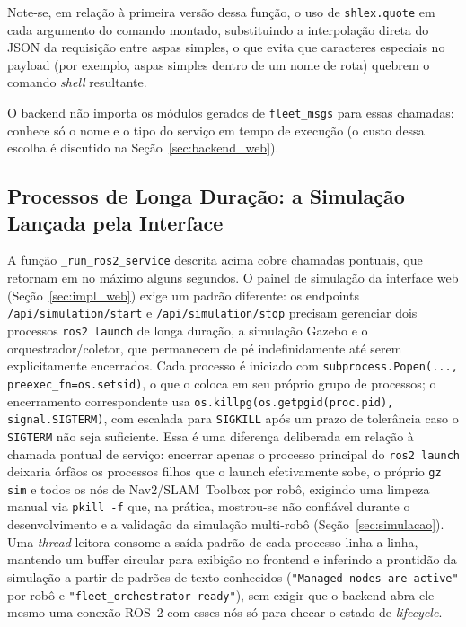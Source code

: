 Note-se, em relação à primeira versão dessa função, o uso de \texttt{shlex.\allowbreak quote}
em cada argumento do comando montado, substituindo a interpolação direta
do JSON da requisição entre aspas simples, o que evita que caracteres
especiais no payload (por exemplo, aspas simples dentro de um nome de rota)
quebrem o comando \textit{shell} resultante.

O backend não importa os módulos gerados de \texttt{fleet\_\allowbreak msgs} para
essas chamadas: conhece só o nome e o tipo do serviço em tempo de execução (o
custo dessa escolha é discutido na Seção~\ref{sec:backend_web}).

\subsection{Processos de Longa Duração: a Simulação Lançada pela Interface}
\label{sec:impl_backend_simulacao}

A função \texttt{\_\allowbreak run\_\allowbreak ros2\_\allowbreak service} descrita acima cobre chamadas pontuais,
que retornam em no máximo alguns segundos. O painel de simulação da
interface web (Seção~\ref{sec:impl_web}) exige um padrão diferente: os
endpoints \texttt{/\allowbreak api/\allowbreak simulation/\allowbreak start} e \texttt{/\allowbreak api/\allowbreak simulation/\allowbreak stop} precisam
gerenciar dois processos \texttt{ros2 launch} de longa duração, a simulação
Gazebo e o orquestrador/coletor, que permanecem de pé indefinidamente até
serem explicitamente encerrados. Cada processo é iniciado com
\texttt{subprocess.\allowbreak Popen(..., preexec\_\allowbreak fn=os.\allowbreak setsid)}, o que o coloca em seu
próprio grupo de processos; o encerramento correspondente usa
\texttt{os.\allowbreak killpg(os.\allowbreak getpgid(proc.\allowbreak pid), signal.\allowbreak SIGTERM)}, com escalada para
\texttt{SIGKILL} após um prazo de tolerância caso o \texttt{SIGTERM} não seja
suficiente. Essa é uma diferença deliberada em relação à chamada pontual de
serviço: encerrar apenas o processo principal do \texttt{ros2 launch} deixaria
órfãos os processos filhos que o launch efetivamente sobe, o próprio
\texttt{gz sim} e todos os nós de Nav2/SLAM~Toolbox por robô, exigindo uma
limpeza manual via \texttt{pkill -f} que, na prática, mostrou-se não confiável
durante o desenvolvimento e a validação da simulação multi-robô
(Seção~\ref{sec:simulacao}). Uma \textit{thread} leitora consome a saída
padrão de cada processo linha a linha, mantendo um buffer circular para
exibição no frontend e inferindo a prontidão da simulação a partir de
padrões de texto conhecidos (\texttt{"Managed nodes are active"} por robô e
\texttt{"fleet\_\allowbreak orchestrator ready"}), sem exigir que o backend abra ele mesmo
uma conexão ROS~2 com esses nós só para checar o estado de \textit{lifecycle}.

